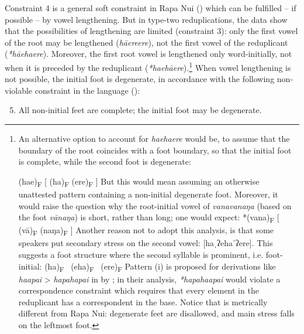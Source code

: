 Constraint 4 is a general soft constraint in Rapa Nui () which can be fulfilled – if possible – by vowel lengthening. But in type-two reduplications, the data show that the possibilities of lengthening are limited (constraint 3): only the first vowel of the root may be lengthened (\textit{h}\textit{ā{\ꞌ}ere{\ꞌ}ere}), not the first vowel of the reduplicant (\textit{*hā{\ꞌ}eha{\ꞌ}ere}). Moreover, the first root vowel is lengthened only word-initially, not when it is preceded by the reduplicant (\textit{*ha{\ꞌ}ehā{\ꞌ}ere}).\footnote{\label{fn:78}An alternative option to account for \textit{ha{\ꞌ}eha{\ꞌ}ere} would be, to assume that the boundary of the root coincides with a foot boundary, so that the initial foot is complete, while the second foot is degenerate: 

\ea
  \textup{(ha{\ꞌ}e)\textsubscript{F}   [ (ha)\textsubscript{F}   ({\ꞌ}ere)\textsubscript{F} ]}
\z
But this would mean assuming an otherwise unattested pattern containing a non-initial degenerate foot. Moreover, it would raise the question why the root-initial vowel of \textit{vanavanaŋa} (based on the foot \textit{vānaŋa}) is short, rather than long; one would expect:
\ea
  \textup{*(vana)\textsubscript{F}   [ (vā)\textsubscript{F}   (naŋa)\textsubscript{F} ]}
\z
Another reason not to adopt this analysis, is that some speakers put secondary stress on the second vowel: [haˌʔehaˈʔere]. This suggests a foot structure where the second syllable is prominent, i.e. foot-initial:
\ea
\textup{(ha)\textsubscript{F}~  ({\ꞌ}eha)\textsubscript{F}~  ({\ꞌ}ere)\textsubscript{F}}
\z
Pattern (i) is proposed for derivations like \textit{haapai} > \textit{hapahapai} in  by \citet[161]{MeyerhoffReynolds1996}; in their analysis, \textit{*hapahaapai} would violate a correspondence constraint which requires that every element in the reduplicant has a correspondent in the base. Notice that  is metrically different from Rapa Nui: degenerate feet are disallowed, and main stress falls on the leftmost foot.}\textstyleFootnoteSymbol{} When vowel lengthening is not possible, the initial foot is degenerate, in accordance with the following non-violable constraint in the language ():

\begin{enumerate}
\setcounter{enumi}{4}

\item \glt
All non-initial feet are complete; the initial foot may be degenerate.

\end{enumerate}


